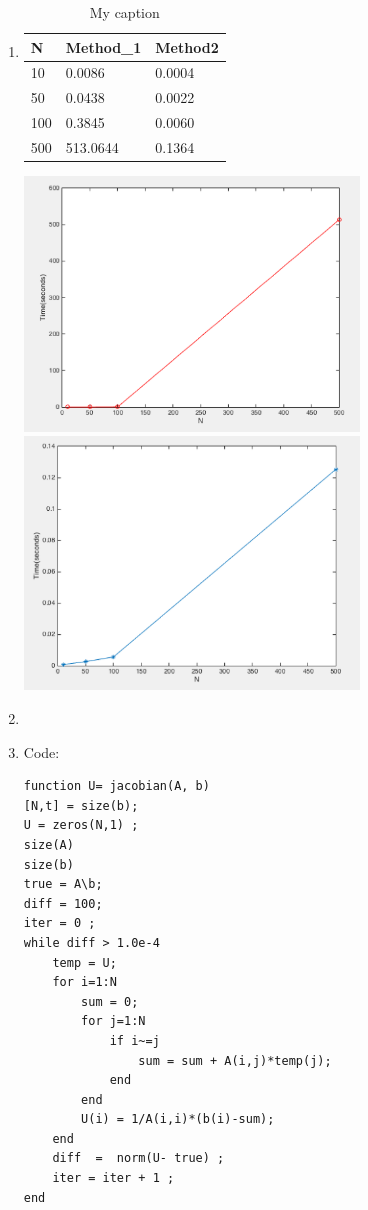 \documentclass{article}
\begin{document}
\begin{enumerate}
\item 
\begin{table}[]
\centering
\caption{My caption}
\label{my-label}
\begin{tabular}{lll}
\hline
N   & Method\_1 & Method2 \\  \hline
10  & 0.0086    & 0.0004  \\ \hline
50  & 0.0438    & 0.0022  \\ \hline
100 & 0.3845    & 0.0060  \\ \hline
500 & 513.0644  & 0.1364  \\ \hline
\end{tabular}
\end{table}

\includegraphics[width=0.7\textwidth]{method1} 
\includegraphics[width=0.7\textwidth]{method2} 



\item


\item 

Code: \\
\begin{lstlisting} 
function U= jacobian(A, b)
[N,t] = size(b); 
U = zeros(N,1) ; 
size(A) 
size(b) 
true = A\b; 
diff = 100; 
iter = 0 ; 
while diff > 1.0e-4 
    temp = U; 
    for i=1:N
        sum = 0; 
        for j=1:N
            if i~=j
                sum = sum + A(i,j)*temp(j); 
            end
        end
        U(i) = 1/A(i,i)*(b(i)-sum); 
    end
    diff  =  norm(U- true) ; 
    iter = iter + 1 ; 
end 


\end{lstlisting}
\end{enumerate}
\end{document}
